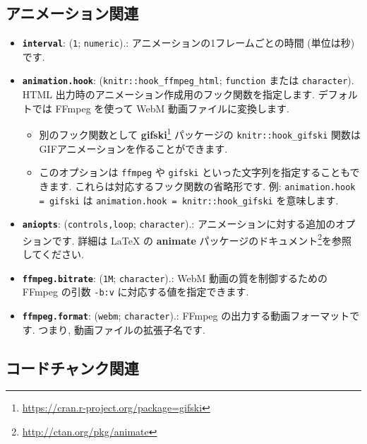 \documentclass[
  11pt,
]{bxjsreport}
\providecommand{\tightlist}{%
  \setlength{\itemsep}{0pt}\setlength{\parskip}{0pt}}
\renewcommand{\href}[2]{#2\footnote{\url{#1}}}
\begin{document}
\hypertarget{animation-options}{%
\subsection{アニメーション関連}\label{animation-options}}

\begin{itemize}
\tightlist
\item
  \textbf{\texttt{interval}}: (\texttt{1}; \texttt{numeric}).: アニメーションの1フレームごとの時間 (単位は秒) です.
\item
  \textbf{\texttt{animation.hook}}: (\texttt{knitr::hook\_ffmpeg\_html}; \texttt{function} または \texttt{character}). HTML 出力時のアニメーション作成用のフック関数を指定します. デフォルトでは FFmpeg を使って WebM 動画ファイルに変換します.

  \begin{itemize}
  \tightlist
  \item
    別のフック関数として \href{https://cran.r-project.org/package=gifski}{\textbf{gifski}} パッケージの \texttt{knitr::hook\_gifski} 関数はGIFアニメーションを作ることができます.
  \item
    このオプションは \texttt{\textquotesingle{}ffmpeg\textquotesingle{}} や \texttt{\textquotesingle{}gifski\textquotesingle{}} といった文字列を指定することもできます. これらは対応するフック関数の省略形です. 例: \texttt{animation.hook = \textquotesingle{}gifski\textquotesingle{}} は \texttt{animation.hook = knitr::hook\_gifski} を意味します.
  \end{itemize}
\item
  \textbf{\texttt{aniopts}}: (\texttt{\textquotesingle{}controls,loop\textquotesingle{}}; \texttt{character}).: アニメーションに対する追加のオプションです. 詳細は LaTeX の \href{http://ctan.org/pkg/animate}{\textbf{animate} パッケージのドキュメント}を参照してください.
\item
  \textbf{\texttt{ffmpeg.bitrate}}: (\texttt{1M}; \texttt{character}).: WebM 動画の質を制御するための FFmpeg の引数 \texttt{-b:v} に対応する値を指定できます.
\item
  \textbf{\texttt{ffmpeg.format}}: (\texttt{webm}; \texttt{character}).: FFmpeg の出力する動画フォーマットです. つまり, 動画ファイルの拡張子名です.
\end{itemize}

\hypertarget{code-chunk}{%
\subsection{コードチャンク関連}\label{code-chunk}}
\end{document}
